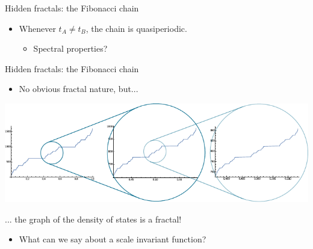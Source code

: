 \documentclass[xcolor=x11names,compress,professionalfonts]{beamer}
\renewcommand{\(}{\begin{columns}}
\renewcommand{\)}{\end{columns}}
\newcommand{\<}[1]{\begin{column}{#1}}
\renewcommand{\>}{\end{column}}
\begin{document}
\begin{frame}{Hidden fractals: the Fibonacci chain}
\begin{itemize}
	\item Whenever $t_A \neq t_B$, the chain is quasiperiodic.
		\begin{itemize}
			\item Spectral properties? 
		\end{itemize}
	\end{itemize}
\end{frame}
	
\begin{frame}{Hidden fractals: the Fibonacci chain}

	\begin{itemize}
	\item No obvious fractal nature, but...
    \end{itemize}
     {\centering
    	\includegraphics[scale=.9]{idos.pdf}
    	
     }
     ... the graph of the density of states is a fractal!
     
     \begin{itemize}
     	\item What can we say about a scale invariant function?
      \end{itemize}
	
\end{frame}
\end{document}
